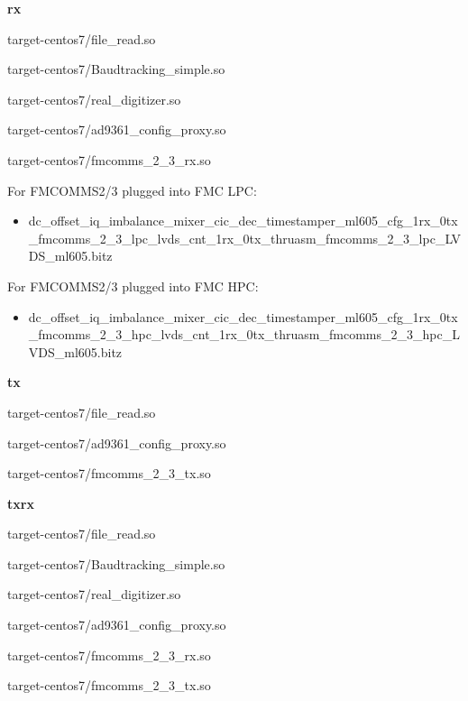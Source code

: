 \begin{appendices}
	\noindent\textbf{rx}
	\begin{itemize}
	\begin{minipage}[t]{.5\textwidth}
	\item target-centos7/file\_read.so
	\item target-centos7/Baudtracking\_simple.so
	\item target-centos7/real\_digitizer.so
	\end{minipage}
	\begin{minipage}[t]{.5\textwidth}
	\item target-centos7/ad9361\_config\_proxy.so
	\item target-centos7/fmcomms\_2\_3\_rx.so
	\end{minipage}
	\end{itemize}
	\noindent For FMCOMMS2/3 plugged into FMC LPC:
	\begin{itemize}
	\item dc\_offset\_iq\_imbalance\_mixer\_cic\_dec\_timestamper\_ml605\_cfg\_1rx\_0tx \\
\_fmcomms\_2\_3\_lpc\_lvds\_cnt\_1rx\_0tx\_thruasm\_fmcomms\_2\_3\_lpc\_LVDS\_ml605.bitz
	\end{itemize}
	\noindent For FMCOMMS2/3 plugged into FMC HPC:
	\begin{itemize}
	\item dc\_offset\_iq\_imbalance\_mixer\_cic\_dec\_timestamper\_ml605\_cfg\_1rx\_0tx \\
\_fmcomms\_2\_3\_hpc\_lvds\_cnt\_1rx\_0tx\_thruasm\_fmcomms\_2\_3\_hpc\_LVDS\_ml605.bitz
	\end{itemize}

	\noindent\textbf{tx}
	\begin{itemize}
	\begin{minipage}[t]{.5\textwidth}
	\item target-centos7/file\_read.so
	\end{minipage}
	\begin{minipage}[t]{.5\textwidth}
	\item target-centos7/ad9361\_config\_proxy.so
	\item target-centos7/fmcomms\_2\_3\_tx.so
	\end{minipage}
	\end{itemize}

	\noindent\textbf{txrx} %
	\begin{itemize}
	\begin{minipage}[t]{.5\textwidth}
	\item target-centos7/file\_read.so
	\item target-centos7/Baudtracking\_simple.so
	\item target-centos7/real\_digitizer.so
	\end{minipage}
	\begin{minipage}[t]{.5\textwidth}
	\item target-centos7/ad9361\_config\_proxy.so
	\item target-centos7/fmcomms\_2\_3\_rx.so
	\item target-centos7/fmcomms\_2\_3\_tx.so
	\end{minipage}
	\end{itemize}
\pagebreak

\end{appendices}
